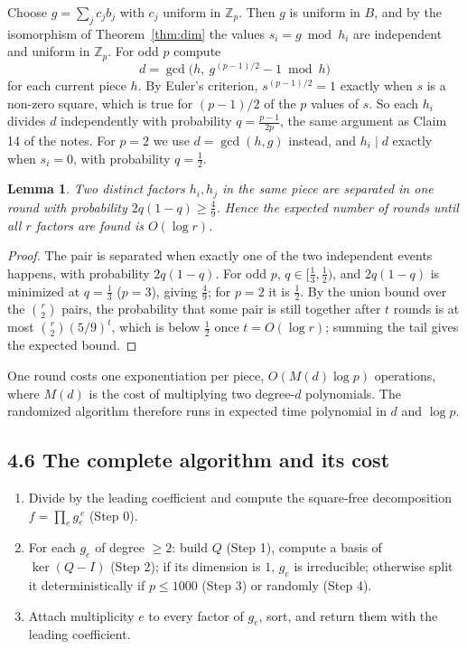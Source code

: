 \documentclass[11pt,a4paper]{article}
\newtheorem{lemma}[theorem]{Lemma}
\newcommand{\Zp}{\mathbb{Z}_p}
\begin{document}
Choose $g = \sum_j c_j b_j$ with $c_j$ uniform in $\Zp$. Then $g$ is uniform in $B$, and by the
isomorphism of Theorem~\ref{thm:dim} the values $s_i = g \bmod h_i$ are independent and uniform in
$\Zp$. For odd $p$ compute
\[
  d = \gcd\big(h,\ g^{(p-1)/2} - 1 \bmod h\big)
\]
for each current piece $h$. By Euler's criterion, $s^{(p-1)/2} = 1$ exactly when $s$ is a non-zero
square, which is true for $(p-1)/2$ of the $p$ values of $s$. So each $h_i$ divides $d$
independently with probability $q = \frac{p-1}{2p}$, the same argument as Claim 14 of the notes.
For $p = 2$ we use $d = \gcd(h, g)$ instead, and $h_i \mid d$ exactly when $s_i = 0$, with
probability $q = \tfrac12$.

\begin{lemma}
Two distinct factors $h_i, h_j$ in the same piece are separated in one round with probability
$2q(1-q) \ge \tfrac49$. Hence the expected number of rounds until all $r$ factors are found is
$O(\log r)$.
\end{lemma}

\begin{proof}
The pair is separated when exactly one of the two independent events happens, with probability
$2q(1-q)$. For odd $p$, $q \in [\tfrac13, \tfrac12)$, and $2q(1-q)$ is minimized at $q = \tfrac13$
($p = 3$), giving $\tfrac49$; for $p = 2$ it is $\tfrac12$. By the union bound over the
$\binom{r}{2}$ pairs, the probability that some pair is still together after $t$ rounds is at most
$\binom{r}{2}(5/9)^t$, which is below $\tfrac12$ once $t = O(\log r)$; summing the tail gives the
expected bound.
\end{proof}

One round costs one exponentiation per piece, $O(M(d)\log p)$ operations, where $M(d)$ is the cost
of multiplying two degree-$d$ polynomials. The randomized algorithm therefore runs in expected time
polynomial in $d$ and $\log p$.

\subsection*{4.6 The complete algorithm and its cost}

\begin{enumerate}
    \item Divide by the leading coefficient and compute the square-free decomposition $f = \prod_e g_e^{\,e}$ (Step 0).
    \item For each $g_e$ of degree $\ge 2$: build $Q$ (Step 1), compute a basis of $\ker(Q - I)$ (Step 2); if its dimension is $1$, $g_e$ is irreducible; otherwise split it deterministically if $p \le 1000$ (Step 3) or randomly (Step 4).
    \item Attach multiplicity $e$ to every factor of $g_e$, sort, and return them with the leading coefficient.
\end{enumerate}
\end{document}
